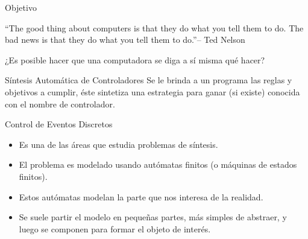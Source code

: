 \begin{frame}{Objetivo}
    \begin{block}{}
    ``The good thing about computers is that they do what you tell them to do. The bad news is that they do what you tell them to do.''\hfill – Ted Nelson 
    \end{block}
    
    \pause
    ¿Es posible hacer que una computadora se diga a sí misma qué hacer?
    
    \pause
    \begin{block}{Síntesis Automática de Controladores}
     Se le brinda a un programa las reglas y objetivos a cumplir, éste sintetiza una estrategia para ganar (si existe) conocida con el nombre de controlador.
    \end{block}

\end{frame}
\begin{frame}{Control de Eventos Discretos}
    \begin{itemize}
     \item Es una de las áreas que estudia problemas de síntesis.
     \item El problema es modelado usando autómatas finitos (o máquinas de estados finitos).
     \pause
     \item Estos autómatas modelan la parte que nos interesa de la realidad.
     \item Se suele partir el modelo en pequeñas partes, más simples de abstraer, y luego se componen para formar el objeto de interés.
    \end{itemize}
\end{frame}
